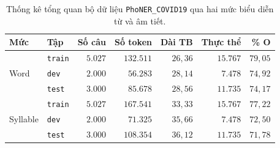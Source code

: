 \documentclass[11pt,a4paper,twocolumn]{article}
\begin{document}
\begin{table}[t]
\centering
\small
\begin{tabular}{llrrrrr}
\hline
\textbf{Mức} & \textbf{Tập} & \textbf{Số câu} & \textbf{Số token} & \textbf{Dài TB} & \textbf{Thực thể} & \textbf{\% O} \\
\hline
\multirow{3}{*}{Word}
 & \texttt{train} & $5.027$ & $132.511$ & $26{,}36$ & $15.767$ & $79{,}05$ \\
 & \texttt{dev}   & $2.000$ & $56.283$  & $28{,}14$ & $7.478$  & $74{,}92$ \\
 & \texttt{test}  & $3.000$ & $85.678$  & $28{,}56$ & $11.735$ & $74{,}17$ \\
\hline
\multirow{3}{*}{Syllable}
 & \texttt{train} & $5.027$ & $167.541$ & $33{,}33$ & $15.767$ & $77{,}22$ \\
 & \texttt{dev}   & $2.000$ & $71.325$  & $35{,}66$ & $7.478$  & $72{,}50$ \\
 & \texttt{test}  & $3.000$ & $108.354$ & $36{,}12$ & $11.735$ & $71{,}78$ \\
\hline
\end{tabular}
\caption{Thống kê tổng quan bộ dữ liệu \texttt{PhoNER\_COVID19} qua hai mức biểu diễn từ và âm tiết.}
\label{tab:data_splits}
\end{table}
\end{document}
